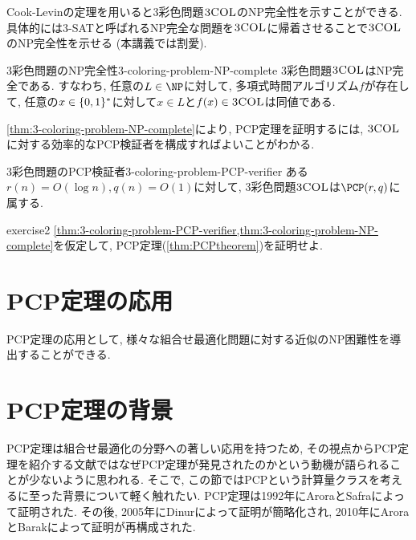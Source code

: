 
Cook-Levinの定理を用いると3彩色問題$\textsc{3COL}$のNP完全性を示すことができる.
具体的には3-SATと呼ばれるNP完全な問題を$\textsc{3COL}$に帰着させることで$\textsc{3COL}$のNP完全性を示せる (本講義では割愛).

\begin{theorem}{3彩色問題のNP完全性}{3-coloring-problem-NP-complete}
  3彩色問題$\textsc{3COL}$はNP完全である. すなわち, 任意の$L\in\NP$に対して, 多項式時間アルゴリズム$f$が存在して, 任意の$x\in\{0,1\}^*$に対して$x\in L$と$f(x)\in\textsc{3COL}$は同値である.
\end{theorem}

\cref{thm:3-coloring-problem-NP-complete}により, PCP定理を証明するには, $\textsc{3COL}$に対する効率的なPCP検証者を構成すればよいことがわかる.

\begin{theorem}{3彩色問題のPCP検証者}{3-coloring-problem-PCP-verifier}
  ある$r(n)=O(\log n),q(n)=O(1)$に対して, 3彩色問題$\textsc{3COL}$は$\PCP(r,q)$に属する.
\end{theorem}

\begin{exercise}{}{exercise2}
  \cref{thm:3-coloring-problem-PCP-verifier,thm:3-coloring-problem-NP-complete}を仮定して, PCP定理(\cref{thm:PCPtheorem})を証明せよ.
\end{exercise}

\section{PCP定理の応用}
PCP定理の応用として, 様々な組合せ最適化問題に対する近似のNP困難性を導出することができる.

\section{PCP定理の背景}
PCP定理は組合せ最適化の分野への著しい応用を持つため,
その視点からPCP定理を紹介する文献ではなぜPCP定理が発見されたのかという動機が語られることが少ないように思われる.
そこで, この節ではPCPという計算量クラスを考えるに至った背景について軽く触れたい.
PCP定理は1992年にAroraとSafraによって証明された.
その後, 2005年にDinurによって証明が簡略化され, 2010年にAroraとBarakによって証明が再構成された.



